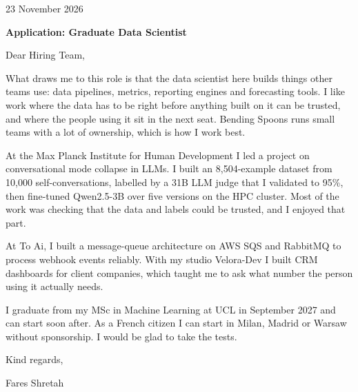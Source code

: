 \documentclass[11pt, a4paper]{article}
\begin{document}
23 November 2026

\textbf{Application: Graduate Data Scientist}

Dear Hiring Team,

What draws me to this role is that the data scientist here builds things other teams use: data pipelines, metrics, reporting engines and forecasting tools. I like work where the data has to be right before anything built on it can be trusted, and where the people using it sit in the next seat. Bending Spoons runs small teams with a lot of ownership, which is how I work best.

At the Max Planck Institute for Human Development I led a project on conversational mode collapse in LLMs. I built an 8,504-example dataset from 10,000 self-conversations, labelled by a 31B LLM judge that I validated to 95\%, then fine-tuned Qwen2.5-3B over five versions on the HPC cluster. Most of the work was checking that the data and labels could be trusted, and I enjoyed that part.

At To Ai, I built a message-queue architecture on AWS SQS and RabbitMQ to process webhook events reliably. With my studio Velora-Dev I built CRM dashboards for client companies, which taught me to ask what number the person using it actually needs.

I graduate from my MSc in Machine Learning at UCL in September 2027 and can start soon after. As a French citizen I can start in Milan, Madrid or Warsaw without sponsorship. I would be glad to take the tests.

Kind regards,

Fares Shretah
\end{document}

